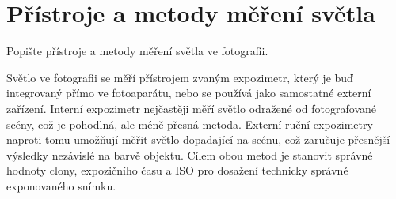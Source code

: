 \section{Přístroje a metody měření světla}
Popište přístroje a metody měření světla ve fotografii.

Světlo ve fotografii se měří přístrojem zvaným expozimetr, který je buď integrovaný přímo ve fotoaparátu, nebo se 
používá jako samostatné externí zařízení. Interní expozimetr nejčastěji měří světlo odražené od fotografované scény, 
což je pohodlná, ale méně přesná metoda. Externí ruční expozimetry naproti tomu umožňují měřit světlo dopadající na 
scénu, což zaručuje přesnější výsledky nezávislé na barvě objektu. Cílem obou metod je stanovit správné hodnoty clony, 
expozičního času a ISO pro dosažení technicky správně exponovaného snímku.